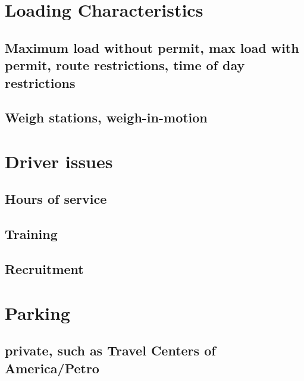 \documentclass[
]{book}
\begin{document}
\hypertarget{loading-characteristics}{%
\chapter{Loading Characteristics}\label{loading-characteristics}}

\hypertarget{maximum-load-without-permit-max-load-with-permit-route-restrictions-time-of-day-restrictions}{%
\section{Maximum load without permit, max load with permit, route restrictions, time of day restrictions}\label{maximum-load-without-permit-max-load-with-permit-route-restrictions-time-of-day-restrictions}}

\hypertarget{weigh-stations-weigh-in-motion}{%
\section{Weigh stations, weigh-in-motion}\label{weigh-stations-weigh-in-motion}}

\hypertarget{driver-issues}{%
\chapter{Driver issues}\label{driver-issues}}

\hypertarget{hours-of-service}{%
\section{Hours of service}\label{hours-of-service}}

\hypertarget{training}{%
\section{Training}\label{training}}

\hypertarget{recruitment}{%
\section{Recruitment}\label{recruitment}}

\hypertarget{parking}{%
\chapter{Parking}\label{parking}}

\hypertarget{parking-privateparking}{%
\section{private, such as Travel Centers of America/Petro}\label{parking-privateparking}}
\end{document}

